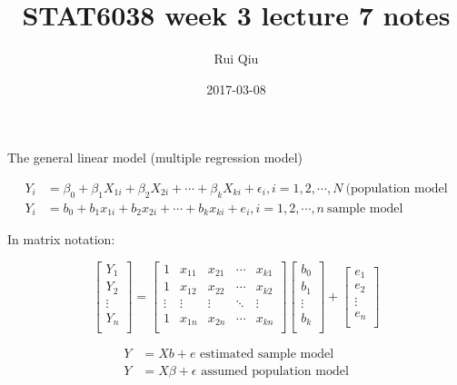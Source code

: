 \documentclass[a4paper, 11pt, twoside]{article}
\begin{document}
\title{STAT6038 week 3 lecture 7 notes}
\author{Rui Qiu}
\date{2017-03-08}

\maketitle

The general linear model (multiple regression model)

\[
\begin{split}
	Y_i &=\beta_0+\beta_1X_{1i}+\beta_2X_{2i}+\cdots + \beta_k X_{ki} + \epsilon_i, i = 1, 2, \cdots, N\ \text{(population model}\\
	Y_i&=b_0+b_1x_{1i}+b_2x_{2i}+\cdots +b_kx_{ki}+e_i, i = 1,2,\cdots, n\ \text{sample model}
\end{split}
\]

In matrix notation:

\[
\begin{bmatrix}
	Y_1\\Y_2\\\vdots\\Y_n\\
\end{bmatrix}
=
\begin{bmatrix}
	1 & x_{11} & x_{21} & \cdots & x_{k1}\\
	1 & x_{12} & x_{22} & \cdots & x_{k2}\\
	\vdots & \vdots & \vdots & \ddots & \vdots\\
	1 & x_{1n} & x_{2n} & \cdots & x_{kn}\\
\end{bmatrix}
\begin{bmatrix}
	b_0\\b_1\\\vdots\\b_k\\
\end{bmatrix}
+
\begin{bmatrix}
	e_1\\e_2\\\vdots\\e_n\\
\end{bmatrix}
\]

\[
\begin{split}
	Y&=Xb+e \text{ estimated sample model}\\
	Y&=X\beta + \epsilon \text{ assumed population model}\\	
\end{split}
\]
\end{document}
